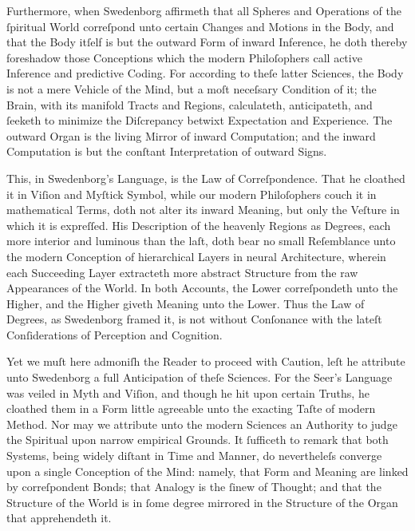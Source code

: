 \documentclass[12pt]{book}
\begin{document}
\vspace{1em}

\noindent
Furthermore, when Swedenborg affirmeth that all Spheres and Operations of the ſpiritual World correſpond unto certain Changes and Motions in the Body, and that the Body itſelf is but the outward Form of inward Inference, he doth thereby foreshadow those Conceptions which the modern Philoſophers call active Inference and predictive Coding. For according to theſe latter Sciences, the Body is not a mere Vehicle of the Mind, but a moſt neceſsary Condition of it; the Brain, with its manifold Tracts and Regions, calculateth, anticipateth, and ſeeketh to minimize the Diſcrepancy betwixt Expectation and Experience. The outward Organ is the living Mirror of inward Computation; and the inward Computation is but the conſtant Interpretation of outward Signs.

\vspace{1em}

\noindent
This, in Swedenborg’s Language, is the Law of Correſpondence. That he cloathed it in Viſion and Myſtick Symbol, while our modern Philoſophers couch it in mathematical Terms, doth not alter its inward Meaning, but only the Veſture in which it is expreſſed. His Description of the heavenly Regions as Degrees, each more interior and luminous than the laſt, doth bear no small Reſemblance unto the modern Conception of hierarchical Layers in neural Architecture, wherein each Succeeding Layer extracteth more abstract Structure from the raw Appearances of the World. In both Accounts, the Lower correſpondeth unto the Higher, and the Higher giveth Meaning unto the Lower. Thus the Law of Degrees, as Swedenborg framed it, is not without Conſonance with the lateſt Conſiderations of Perception and Cognition.

\vspace{1em}

\noindent
Yet we muſt here admoniſh the Reader to proceed with Caution, leſt he attribute unto Swedenborg a full Anticipation of theſe Sciences. For the Seer’s Language was veiled in Myth and Viſion, and though he hit upon certain Truths, he cloathed them in a Form little agreeable unto the exacting Taſte of modern Method. Nor may we attribute unto the modern Sciences an Authority to judge the Spiritual upon narrow empirical Grounds. It ſufficeth to remark that both Systems, being widely diſtant in Time and Manner, do nevertheleſs converge upon a single Conception of the Mind: namely, that Form and Meaning are linked by correſpondent Bonds; that Analogy is the ſinew of Thought; and that the Structure of the World is in ſome degree mirrored in the Structure of the Organ that apprehendeth it.
\end{document}
